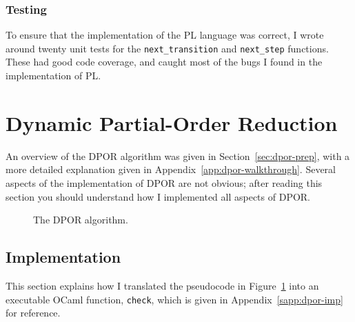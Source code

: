 \documentclass[12pt,a4paper,twoside,openany]{report}
\begin{document}
\subsubsection{Testing}
To ensure that the implementation of the PL
language was correct, I wrote around
twenty unit tests for
the \texttt{next\_transition} and
\texttt{next\_step} functions. These had good
code coverage, and caught most of the bugs I
found in the implementation of PL.


\section{Dynamic Partial-Order Reduction}
An overview of the DPOR
algorithm was given in Section~\ref{sec:dpor-prep},
with a more detailed explanation
given in Appendix~\ref{app:dpor-walkthrough}.
Several aspects of the implementation of DPOR
are not obvious; after reading this section
you should understand how I implemented
all aspects of DPOR.

\begin{figure}[h]
	\dporpseudocode
	\caption{The DPOR algorithm.}
	\label{fig:dpor-imp-pscode}
\end{figure}

\subsection{Implementation}
This section explains how I translated
the pseudocode in Figure~\ref{fig:dpor-imp-pscode}
into an executable OCaml function, \texttt{check},
which is given in Appendix~\ref{sapp:dpor-imp}
for reference.
\end{document}
